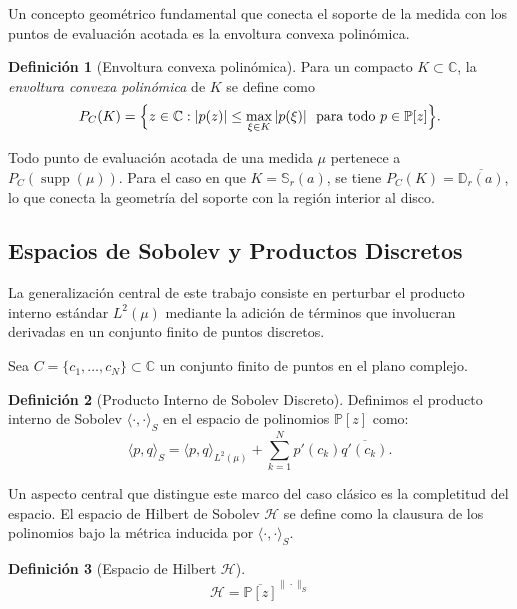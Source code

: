\documentclass[12pt,a4paper]{article}
\theoremstyle{definition}
\newtheorem{definition}{Definición}
\theoremstyle{remark}
\newcommand{\Poly}{\mathbb{P}[z]}
\begin{document}
Un concepto geométrico fundamental que conecta el soporte de la medida con los puntos de evaluación acotada es la envoltura convexa polinómica.

\begin{definition}[Envoltura convexa polinómica]\label{def:envoltura_polinomica}
	Para un compacto $K \subset \mathbb{C}$, la \emph{envoltura convexa polinómica} de $K$ se define como
	\[
		P_C(K) = \Bigl\{ z \in \mathbb{C} : |p(z)| \leq \max_{\xi \in K} |p(\xi)|\ \text{ para todo } p \in \mathbb{P}[z] \Bigr\}.
	\]
\end{definition}

Todo punto de evaluación acotada de una medida $\mu$ pertenece a $P_C(\operatorname{supp}(\mu))$. Para el caso en que $K = \mathbb{S}_r(a)$, se tiene $P_C(K) = \overline{\mathbb{D}_r(a)}$, lo que conecta la geometría del soporte con la región interior al disco.

\subsection{Espacios de Sobolev y Productos Discretos}

La generalización central de este trabajo consiste en perturbar el producto interno estándar $L^2(\mu)$ mediante la adición de términos que involucran derivadas en un conjunto finito de puntos discretos.

Sea $C = \{c_1, \dots, c_N\} \subset \mathbb{C}$ un conjunto finito de puntos en el plano complejo.

\begin{definition}[Producto Interno de Sobolev Discreto]
	Definimos el producto interno de Sobolev $\langle \cdot, \cdot \rangle_S$ en el espacio de polinomios $\Poly$ como:
	\begin{equation} \label{eq:sobolev_inner_prod}
		\langle p, q \rangle_S = \langle p, q \rangle_{L^2(\mu)} + \sum_{k=1}^N p'(c_k) \overline{q'(c_k)}.
	\end{equation}
\end{definition}

Un aspecto central que distingue este marco del caso clásico es la completitud del espacio. El espacio de Hilbert de Sobolev $\mathcal{H}$ se define como la clausura de los polinomios bajo la métrica inducida por $\langle \cdot, \cdot \rangle_S$.

\begin{definition}[Espacio de Hilbert $\mathcal{H}$]
	\begin{equation}
		\mathcal{H} = \overline{\Poly}^{\|\cdot\|_S}
	\end{equation}
\end{definition}
\end{document}

